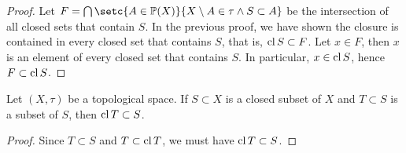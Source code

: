 \begin{proof}
    Let \(F = \bigcap \setc{A \in \mathbb{P}(X)}{X \setminus A \in \tau \land S \subset A}\) be the intersection of all closed sets that contain \(S\). In the previous proof, we have shown the closure is contained in every closed set that contains \(S\), that is, \(\operatorname{cl}{S} \subset F\). Let \(x \in F\), then \(x\) is an element of every closed set that contains \(S\). In particular, \(x \in \operatorname{cl}{S}\), hence \(F \subset \operatorname{cl}{S}\).
\end{proof}
\begin{corollary}
    Let \((X, \tau)\) be a topological space. If \(S \subset X\) is a closed subset of \(X\) and \(T \subset S\) is a subset of \(S\), then \(\operatorname{cl}{T} \subset S\).
\end{corollary}
\begin{proof}
    Since \(T \subset S\) and \(T \subset \operatorname{cl}{T}\), we must have \(\operatorname{cl}{T} \subset S\).
\end{proof}

